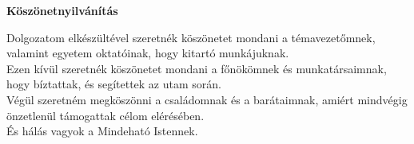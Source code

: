 \textbf{\large{Köszönetnyilvánítás}}\\[32pt]

\thispagestyle{fancy}
\pagestyle{fancy}

Dolgozatom elkészültével szeretnék köszönetet mondani a témavezetőmnek, valamint egyetem oktatóinak, hogy kitartó munkájuknak. \\

Ezen kívül szeretnék köszönetet mondani a főnökömnek és munkatársaimnak, hogy bíztattak, és segítettek az utam során.\\

Végül szeretném megköszönni a családomnak és a barátaimnak, amiért mindvégig önzetlenül támogattak célom elérésében.\\

És hálás vagyok a Mindeható Istennek. 